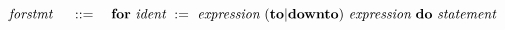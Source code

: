 \[
	~\emph{forstmt}~ \quad ::= \quad
		\textbf{for} ~\emph{ident}~ := ~\emph{expression}~ ( \textbf{to} | \textbf{downto})
			~\emph{expression}~ \textbf{do} ~\emph{statement}~
\]